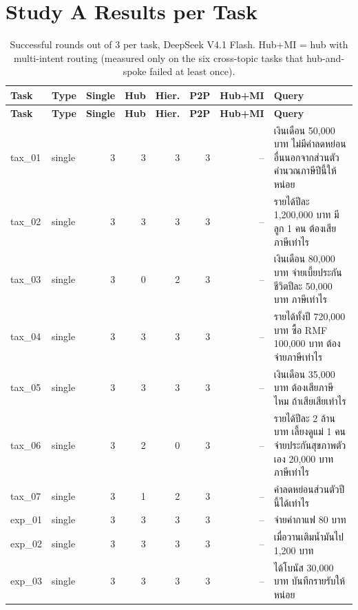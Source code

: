 \documentclass[11pt,a4paper]{article}
\begin{document}
\section{Study A Results per Task}
{\scriptsize
\begin{longtable}{llrrrrrp{7.2cm}}
\caption{Successful rounds out of 3 per task, DeepSeek V4.1 Flash. Hub+MI = hub with multi-intent routing (measured only on the six cross-topic tasks that hub-and-spoke failed at least once).}\label{tab:app-a-ds}\\
\toprule
\textbf{Task} & \textbf{Type} & \textbf{Single} & \textbf{Hub} & \textbf{Hier.} & \textbf{P2P} & \textbf{Hub+MI} & \textbf{Query} \\
\midrule
\endfirsthead
\toprule
\textbf{Task} & \textbf{Type} & \textbf{Single} & \textbf{Hub} & \textbf{Hier.} & \textbf{P2P} & \textbf{Hub+MI} & \textbf{Query} \\
\midrule
\endhead
\bottomrule
\endfoot
tax\_\allowbreak{}01 & single & 3 & 3 & 3 & 3 & -- & {\thaifont เงินเดือน }50,000 {\thaifont บาท ไม่มีค่าลดหย่อนอื่นนอกจากส่วนตัว คำนวณภาษีปีนี้ให้หน่อย} \\
tax\_\allowbreak{}02 & single & 3 & 3 & 3 & 3 & -- & {\thaifont รายได้ปีละ }1,200,000 {\thaifont บาท มีลูก }1 {\thaifont คน ต้องเสียภาษีเท่าไร} \\
tax\_\allowbreak{}03 & single & 3 & 0 & 2 & 3 & -- & {\thaifont เงินเดือน }80,000 {\thaifont บาท จ่ายเบี้ยประกันชีวิตปีละ }50,000 {\thaifont บาท ภาษีเท่าไร} \\
tax\_\allowbreak{}04 & single & 3 & 3 & 3 & 3 & -- & {\thaifont รายได้ทั้งปี }720,000 {\thaifont บาท ซื้อ }RMF 100,000 {\thaifont บาท ต้องจ่ายภาษีเท่าไร} \\
tax\_\allowbreak{}05 & single & 3 & 3 & 3 & 3 & -- & {\thaifont เงินเดือน }35,000 {\thaifont บาท ต้องเสียภาษีไหม ถ้าเสียเสียเท่าไร} \\
tax\_\allowbreak{}06 & single & 3 & 2 & 0 & 3 & -- & {\thaifont รายได้ปีละ }2 {\thaifont ล้านบาท เลี้ยงดูแม่ }1 {\thaifont คน จ่ายประกันสุขภาพตัวเอง }20,000 {\thaifont บาท ภาษีเท่าไร} \\
tax\_\allowbreak{}07 & single & 3 & 1 & 2 & 3 & -- & {\thaifont ค่าลดหย่อนส่วนตัวปีนี้ได้เท่าไร} \\
exp\_\allowbreak{}01 & single & 3 & 3 & 3 & 3 & -- & {\thaifont จ่ายค่ากาแฟ }80 {\thaifont บาท} \\
exp\_\allowbreak{}02 & single & 3 & 3 & 3 & 3 & -- & {\thaifont เมื่อวานเติมน้ำมันไป }1,200 {\thaifont บาท} \\
exp\_\allowbreak{}03 & single & 3 & 3 & 3 & 3 & -- & {\thaifont ได้โบนัส }30,000 {\thaifont บาท บันทึกรายรับให้หน่อย} \\

\end{longtable}}
\end{document}
